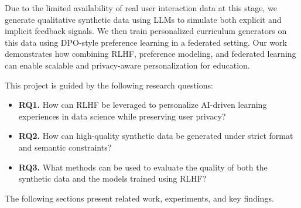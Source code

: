 Due to the limited availability of real user interaction data at this stage, we generate qualitative synthetic data using LLMs to simulate both explicit and implicit feedback signals. We then train personalized curriculum generators on this data using DPO-style preference learning in a federated setting. Our work demonstrates how combining RLHF, preference modeling, and federated learning can enable scalable and privacy-aware personalization for education.

This project is guided by the following research questions:

{\small
\begin{itemize}
    \item \textbf{RQ1.} How can RLHF be leveraged to personalize AI-driven learning experiences in data science while preserving user privacy?
    \item \textbf{RQ2.} How can high-quality synthetic data be generated under strict format and semantic constraints?
    \item \textbf{RQ3.} What methods can be used to evaluate the quality of both the synthetic data and the models trained using RLHF?
\end{itemize}
}

The following sections present related work, experiments, and key findings.
